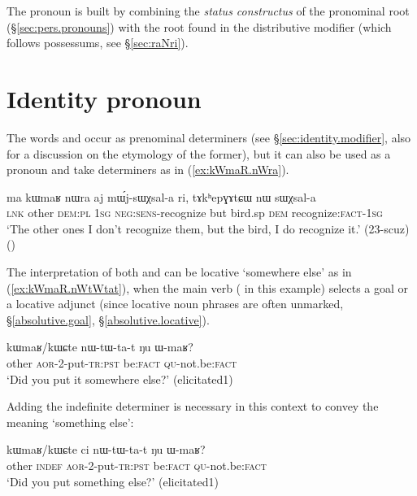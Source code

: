 The pronoun  is built by combining the \textit{status constructus} of the pronominal root  (§\ref{sec:pers.pronouns}) with the root  found in the distributive modifier  (which follows possessums, see §\ref{sec:raNri}).


\section{Identity pronoun} \label{sec:other.pro}
The words  and  occur as prenominal determiners (see §\ref{sec:identity.modifier}, also for a discussion on the etymology of the former), but it can also be used as a pronoun and take determiners as in (\ref{ex:kWmaR.nWra}).

\begin{exe}
\ex \label{ex:kWmaR.nWra}
\gll ma kɯmaʁ nɯra aj mɯ́j-sɯχsal-a ri, tɤkʰepɣɤtɕɯ nɯ sɯχsal-a  \\
\textsc{lnk} other \textsc{dem}:\textsc{pl} \textsc{1sg} \textsc{neg}:\textsc{sens}-recognize but bird.sp \textsc{dem} recognize:\textsc{fact}-\textsc{1sg} \\
\glt `The other ones I don't recognize them, but the  bird, I do recognize it.' (23-scuz)
()
\end{exe}

The interpretation of both  and  can be locative  `somewhere else' as in (\ref{ex:kWmaR.nWtWtat}), when the main verb ( in this example) selects a goal or a locative adjunct (since locative noun phrases are often unmarked, §\ref{absolutive.goal}, §\ref{absolutive.locative}).

\begin{exe}
\ex \label{ex:kWmaR.nWtWtat}
\gll kɯmaʁ/kɯɕte nɯ-tɯ-ta-t ŋu ɯ-maʁ? \\
other  \textsc{aor}-2-put-\textsc{tr}:\textsc{pst} be:\textsc{fact} \textsc{qu}-not.be:\textsc{fact} \\
\glt `Did you put it somewhere else?' (elicitated1)
\end{exe}

Adding the indefinite determiner  is necessary in this context to convey the meaning `something else':

\begin{exe}
\ex \label{ex:kWmaR.ci.nWtWtat}
\gll kɯmaʁ/kɯɕte ci nɯ-tɯ-ta-t ŋu ɯ-maʁ? \\
other \textsc{indef} \textsc{aor}-2-put-\textsc{tr}:\textsc{pst} be:\textsc{fact} \textsc{qu}-not.be:\textsc{fact} \\
\glt `Did you put something else?' (elicitated1)
\end{exe}


